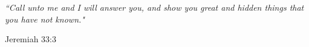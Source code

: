 \documentclass[11pt, twoside]{Thesis} %
\begin{document}
\clearpage %


\pagestyle{empty} %

\null\vfill %

\vspace{1in}
\textit{``Call unto me and I will answer you, and show you great and hidden things that you have not known."}
\begin{flushright}
Jeremiah 33:3
\end{flushright}

\vfill\vfill\vfill\vfill\vfill\vfill\null %

\clearpage %



\end{document}
